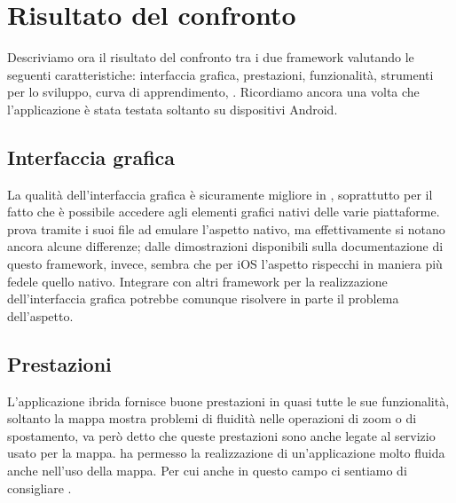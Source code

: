 \chapter{Risultato del confronto}
    Descriviamo ora il risultato del confronto tra i due framework valutando
    le seguenti caratteristiche: interfaccia grafica, prestazioni,
    funzionalità, strumenti per lo sviluppo, curva di apprendimento,
    \crossplat{}. Ricordiamo ancora una
    volta che l'applicazione è stata testata soltanto su dispositivi Android.


    \section{Interfaccia grafica}
    La qualità dell'interfaccia grafica è sicuramente migliore in \tisdk{},
    soprattutto per il fatto che è possibile accedere agli elementi
    grafici nativi delle varie piattaforme. \kendomob{} prova tramite i
    suoi file \css{} ad emulare l'aspetto nativo, ma effettivamente si
    notano ancora alcune differenze; dalle dimostrazioni disponibili sulla
    documentazione di questo framework, invece, sembra che per iOS l'aspetto
    rispecchi in maniera più fedele quello nativo. Integrare \pg{} con
    altri framework per la realizzazione dell'interfaccia grafica potrebbe
    comunque risolvere in parte il problema dell'aspetto.


    \section{Prestazioni}
    L'applicazione ibrida fornisce buone prestazioni in quasi tutte
    le sue funzionalità, soltanto la mappa mostra problemi di fluidità
    nelle operazioni di zoom o di spostamento, va però detto che queste
    prestazioni sono anche legate al servizio usato per la mappa.
    \tisdk{} ha permesso la realizzazione di un'applicazione molto fluida
    anche nell'uso della mappa. Per cui anche in questo campo ci sentiamo
    di consigliare \tisdk{}.


